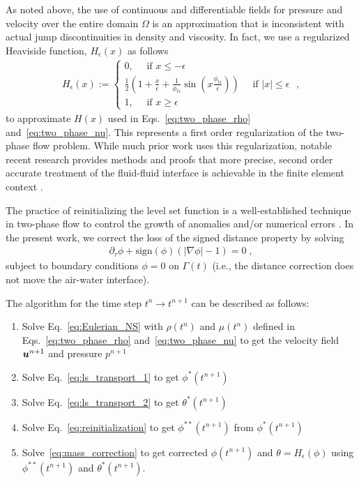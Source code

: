 As noted above, the use of continuous and differentiable fields for pressure and velocity over the entire domain $\Omega$ is an approximation that is inconsistent with actual jump discontinuities in density and viscosity. In fact, we use a regularized Heaviside function, $H_\epsilon(x)$ as follows
\begin{align}
\label{eq:approx_H}
H_{\epsilon}(x) := \begin{cases}
0, \quad \text{ if }x\leq -\epsilon\\
\frac{1}{2}(1+\frac{x}{\epsilon}+\frac{1}{\phi_{ls}}\sin(x\frac{\phi_{ls}}{\epsilon}))\quad\text{ if }|x|\leq \epsilon\\
1, \quad \text{ if }x\geq \epsilon
\end{cases} \; ,
\end{align}
to approximate $H(x)$ used in Eqs.~\ref{eq:two_phase_rho} and~\ref{eq:two_phase_nu}. This represents a first order regularization of the two-phase flow problem. While much prior work uses this regularization, notable recent research provides methods and proofs that more precise, second order accurate treatment of the fluid-fluid interface is achievable in the finite element context \cite{burman2015cutfem,ji2016ifem}.

The practice of reinitializing the level set function is a well-established technique in two-phase flow to control the growth of anomalies and/or numerical errors \cite{trujillo2017distortion}. In the present work, we correct the loss of the signed distance property by solving
\begin{align}
\label{eq:reinitialization}
\partial_\tau \phi + \text{sign}(\phi)(|\nabla\phi|-1) = 0 \; ,
\end{align}
subject to boundary conditions $\phi=0$ on $\Gamma(t)$ (i.e., the distance correction does not move the air-water interface).

The algorithm for the time step $t^n \rightarrow t^{n+1}$ can be described as follows:
\begin{enumerate}
	\item Solve Eq.~\ref{eq:Eulerian_NS} with $\rho(t^n)$ and $\mu(t^n)$ defined in Eqs.~\ref{eq:two_phase_rho} and~\ref{eq:two_phase_nu} to get the velocity field $\boldsymbol{u}^{n+1}$ and pressure $p^{n+1}$ \label{listItem:uANDp}
	\item Solve Eq.~\ref{eq:ls_transport_1} to get $\phi^*(t^{n+1})$
	\item Solve Eq.~\ref{eq:ls_transport_2} to get $\theta^*(t^{n+1})$
	\item Solve Eq.~\ref{eq:reinitialization} to get $\phi^{**}(t^{n+1})$ from $\phi^*(t^{n+1})$
	\item Solve~\ref{eq:mass_correction} to get corrected $\phi(t^{n+1})$ and $\theta=H_{\epsilon}(\phi)$ using $\phi^{**}(t^{n+1})$ and $\theta^*(t^{n+1})$.
\end{enumerate}

